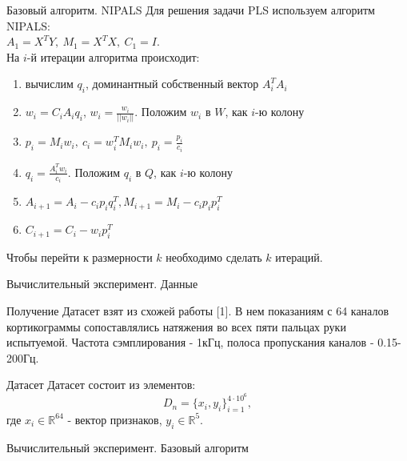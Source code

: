 \documentclass{beamer}
\begin{document}
\begin{frame}{Базовый алгоритм. NIPALS}
Для решения задачи PLS используем алгоритм NIPALS:\\
$A_1 = X^TY,\ M_1 = X^TX,\ C_1 = I$.\\ На $i$-й итерации алгоритма происходит:
\begin{enumerate}
    \item вычислим $q_i$, доминантный собственный вектор $A_i^TA_i$
    \item $w_i = C_i A_i q_i$, $w_i = \frac{w_i}{||w_i||}$. Положим $w_i$ в $W$, как $i$-ю колону
    \item $p_i = M_i w_i,\ c_i = w_i^T M_i w_i,\ p_i = \frac{p_i}{c_i}$
    \item $q_i = \frac{A_i^T w_i}{c_i}$. Положим $q_i$ в $Q$, как $i$-ю колону
    \item $A_{i + 1} = A_i - c_i p_i q_i^T, M_{i + 1} = M_i - c_i p_i p^T_i$
    \item $C_{i + 1} = C_i - w_i p_i^T$
\end{enumerate}
 Чтобы перейти к размерности $k$ необходимо сделать $k$ итераций.
\end{frame}
\begin{frame}{Вычислительный эксперимент. Данные}
\begin{block}{Получение}
Датасет взят из схожей работы [1]. В нем показаниям с 64 каналов кортикограммы сопоставлялись натяжения во всех пяти пальцах руки испытуемой. Частота сэмплирования - 1кГц, полоса пропускания каналов - 0.15-200Гц.
\end{block}
\begin{block}{Датасет}
Датасет состоит из элементов:
$$D_n = \{x_i, y_i\}^{4\cdot10^6}_{i=1},$$
где $x_i \in \mathbb{R}^{64}$ - вектор признаков, $y_i \in \mathbb{R}^5$.\\
\end{block}
\end{frame}
\begin{frame}{Вычислительный эксперимент. Базовый алгоритм}
\begin{figure}[h]
    \begin{minipage}[h]{0.47\linewidth}
     \\
    \end{minipage}
    \hfill
    \begin{minipage}[h]{0.47\linewidth}
     \\
    \end{minipage}
    \vfill
\label{fg:Example}
\end{figure}
\end{frame}
\end{document}
